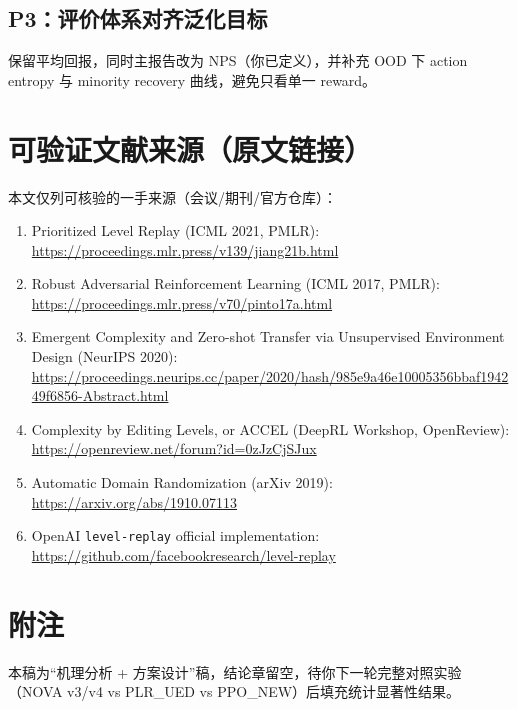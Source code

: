 \documentclass[UTF8,11pt,a4paper]{ctexart}
\begin{document}
\subsection*{P3：评价体系对齐泛化目标}
保留平均回报，同时主报告改为 NPS（你已定义），并补充 OOD 下 action entropy 与 minority recovery 曲线，避免只看单一 reward。

\section{可验证文献来源（原文链接）}
本文仅列可核验的一手来源（会议/期刊/官方仓库）：
\begin{enumerate}
\item Prioritized Level Replay (ICML 2021, PMLR): \\
\url{https://proceedings.mlr.press/v139/jiang21b.html}
\item Robust Adversarial Reinforcement Learning (ICML 2017, PMLR): \\
\url{https://proceedings.mlr.press/v70/pinto17a.html}
\item Emergent Complexity and Zero-shot Transfer via Unsupervised Environment Design (NeurIPS 2020): \\
\url{https://proceedings.neurips.cc/paper/2020/hash/985e9a46e10005356bbaf194249f6856-Abstract.html}
\item Complexity by Editing Levels, or ACCEL (DeepRL Workshop, OpenReview): \\
\url{https://openreview.net/forum?id=0zJzCjSJux}
\item Automatic Domain Randomization (arXiv 2019): \\
\url{https://arxiv.org/abs/1910.07113}
\item OpenAI \texttt{level-replay} official implementation: \\
\url{https://github.com/facebookresearch/level-replay}
\end{enumerate}

\section*{附注}
本稿为“机理分析 + 方案设计”稿，结论章留空，待你下一轮完整对照实验（NOVA v3/v4 vs PLR\_UED vs PPO\_NEW）后填充统计显著性结果。
\end{document}
